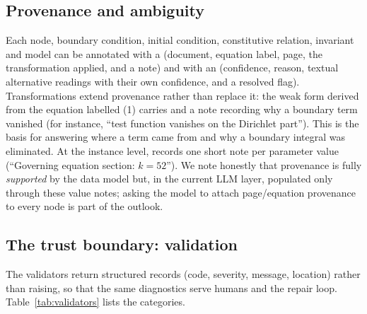 \subsection{Provenance and ambiguity}
Each node, boundary condition, initial condition, constitutive relation, invariant and model can be annotated with a  (document, equation label, page, the transformation applied, and a note) and with an  (confidence, reason, textual alternative readings with their own confidence, and a resolved flag). Transformations extend provenance rather than replace it: the weak form derived from the equation labelled (1) carries  and a note recording why a boundary term vanished (for instance, ``test function vanishes on the Dirichlet part''). This is the basis for answering where a term came from and why a boundary integral was eliminated. At the instance level,  records one short note per parameter value (``Governing equation section: $k=52$''). We note honestly that provenance is fully \emph{supported} by the data model but, in the current LLM layer, populated only through these value notes; asking the model to attach page/equation provenance to every node is part of the outlook.

\subsection{The trust boundary: validation}
\label{sec:validation}
The validators return structured  records (code, severity, message, location) rather than raising, so that the same diagnostics serve humans and the repair loop. Table~\ref{tab:validators} lists the categories.

